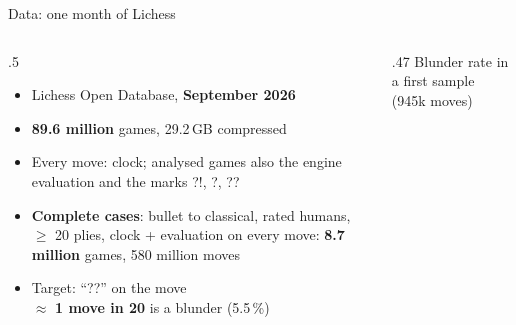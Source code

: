 \documentclass[aspectratio=169,11pt]{beamer}
\newcommand{\hl}[1]{\textcolor{accent}{\textbf{#1}}}
\begin{document}
\begin{frame}{Data: one month of Lichess}
  \begin{columns}[t]
    \begin{column}{.5\textwidth}
      \begin{itemize}
        \item Lichess Open Database, \hl{September 2026}
        \item \textbf{89.6 million} games, 29.2\,GB compressed
        \item Every move: clock; analysed games also the engine evaluation and the marks ?!, ?, ??
        \item \hl{Complete cases}: bullet to classical, rated humans, $\geq$ 20 plies, clock + evaluation on
          every move: \textbf{8.7 million} games, 580 million moves
        \item Target: ``??'' on the move \\ $\approx$ \textbf{1 move in 20} is a blunder (5.5\,\%)
      \end{itemize}
    \end{column}
    \begin{column}{.47\textwidth}
      \small Blunder rate in a first sample (945k moves)\\[.4em]
    \end{column}
  \end{columns}
\end{frame}
\end{document}
